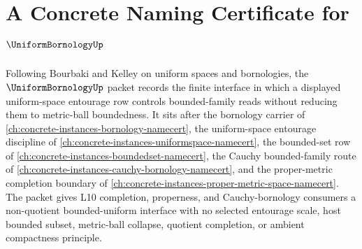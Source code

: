 \chapter{A Concrete Naming Certificate for $\UniformBornologyUp$}
\label{ch:concrete-instances-uniform-bornology-namecert}

Following Bourbaki and Kelley on uniform spaces and bornologies, the $\UniformBornologyUp$ packet records the finite interface in which a displayed uniform-space entourage row controls bounded-family reads without reducing them to metric-ball boundedness. It sits after the bornology carrier of \autoref{ch:concrete-instances-bornology-namecert}, the uniform-space entourage discipline of \autoref{ch:concrete-instances-uniformspace-namecert}, the bounded-set row of \autoref{ch:concrete-instances-boundedset-namecert}, the Cauchy bounded-family route of \autoref{ch:concrete-instances-cauchy-bornology-namecert}, and the proper-metric completion boundary of \autoref{ch:concrete-instances-proper-metric-space-namecert}. The packet gives L10 completion, properness, and Cauchy-bornology consumers a non-quotient bounded-uniform interface with no selected entourage scale, host bounded subset, metric-ball collapse, quotient completion, or ambient compactness principle.

